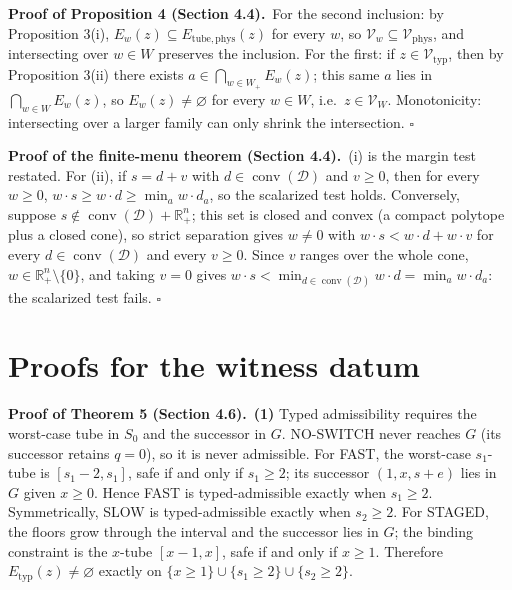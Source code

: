 \documentclass[3p,11pt]{elsarticle}
\begin{document}
\textbf{Proof of Proposition 4 (Section 4.4).}\ For the second inclusion: by Proposition 3(i),
\(E_w(z) \subseteq E_{\mathrm{tube,phys}}(z)\) for every \(w\), so
\(\mathcal{V}_w \subseteq \mathcal{V}_{\mathrm{phys}}\), and
intersecting over \(w \in W\) preserves the inclusion. For the first: if
\(z \in \mathcal{V}_{\mathrm{typ}}\), then by Proposition 3(ii) there
exists \(a \in \bigcap_{w \in W_+} E_w(z)\); this same \(a\) lies in
\(\bigcap_{w \in W} E_w(z)\), so \(E_w(z) \neq \varnothing\) for every
\(w \in W\), i.e.~\(z \in \mathcal{V}_W\). Monotonicity: intersecting
over a larger family can only shrink the intersection. \ensuremath{\square}

\textbf{Proof of the finite-menu theorem (Section 4.4).}\ (i) is the margin test restated. For (ii), if
\(s = d + v\) with \(d \in \operatorname{conv}(\mathcal{D})\) and \(v \ge 0\), then
for every \(w \ge 0\), \(w \cdot s \ge w \cdot d \ge \min_a w \cdot d_a\),
so the scalarized test holds. Conversely, suppose
\(s \notin \operatorname{conv}(\mathcal{D}) + \mathbb{R}^n_+\); this set is closed
and convex (a compact polytope plus a closed cone), so strict separation
gives \(w \ne 0\) with \(w \cdot s < w \cdot d + w \cdot v\) for every
\(d \in \operatorname{conv}(\mathcal{D})\) and every \(v \ge 0\). Since \(v\)
ranges over the whole cone, \(w \in \mathbb{R}^n_+ \setminus \{0\}\), and
taking \(v = 0\) gives
\(w \cdot s < \min_{d \in \operatorname{conv}(\mathcal{D})} w \cdot d =
\min_a w \cdot d_a\): the scalarized test fails. \ensuremath{\square}

\section{Proofs for the witness datum}

\textbf{Proof of Theorem 5 (Section 4.6).}\ \textbf{(1)} Typed admissibility requires the worst-case
tube in \(S_0\) and the successor in \(G\). NO-SWITCH never reaches
\(G\) (its successor retains \(q = 0\)), so it is never admissible. For
FAST, the worst-case \(s_1\)-tube is \([s_1 - 2, s_1]\), safe if and
only if \(s_1 \ge 2\); its successor \((1, x, s + e)\) lies in \(G\)
given \(x \ge 0\). Hence FAST is typed-admissible exactly when
\(s_1 \ge 2\). Symmetrically, SLOW is typed-admissible exactly when
\(s_2 \ge 2\). For STAGED, the floors grow through the interval and the
successor lies in \(G\); the binding constraint is the \(x\)-tube
\([x - 1, x]\), safe if and only if \(x \ge 1\). Therefore
\(E_{\mathrm{typ}}(z) \neq \varnothing\) exactly on
\(\{x \ge 1\} \cup \{s_1 \ge 2\} \cup \{s_2 \ge 2\}\).
\end{document}
